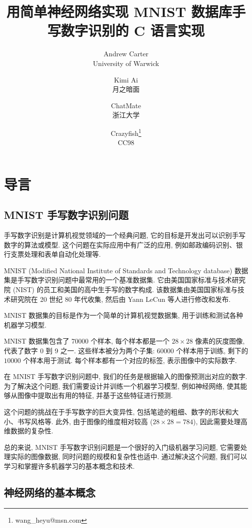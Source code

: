 \documentclass{ctexart}
\title{用简单神经网络实现 MNIST 数据库手写数字识别的 C 语言实现}
\author{Andrew Carter \\ University of Warwick \and Kimi Ai \\ 月之暗面 
\and ChatMate \\ 浙江大学 
\and Crazyfish\footnote{wang\_heyu@msn.com} \\ CC98}
\date{}
\begin{document}
\maketitle

\section{导言}
\label{sec::introduction}

\subsection{MNIST 手写数字识别问题}

手写数字识别是计算机视觉领域的一个经典问题, 它的目标是开发出可以识别手写数字的算法或模型.
这个问题在实际应用中有广泛的应用, 例如邮政编码识别、银行支票处理和表单自动化处理等\cite{lecun1998gradient}.

MNIST (Modified National Institute of Standards and Technology database)
数据集是手写数字识别问题中最常用的一个基准数据集. 它由美国国家标准与技术研究院 (NIST) 的员工和美国的高中生手写的数字构成.
该数据集由美国国家标准与技术研究院在 20 世纪 80 年代收集, 然后由 Yann LeCun 等人进行修改和发布\cite{lecun2010mnist}.

MNIST 数据集的目标是作为一个简单的计算机视觉数据集, 用于训练和测试各种机器学习模型.

MNIST 数据集包含了 70000 个样本, 每个样本都是一个 $28 \times 28$ 像素的灰度图像,
代表了数字 0 到 9 之一. 这些样本被分为两个子集: $60000$ 个样本用于训练,
剩下的 $10000$ 个样本用于测试. 每个样本都有一个对应的标签,
表示图像中的实际数字\cite{simard2003best}.

在 MNIST 手写数字识别问题中, 我们的任务是根据输入的图像预测出对应的数字. 为了解决这个问题,
我们需要设计并训练一个机器学习模型, 例如神经网络, 使其能够从图像中提取出有用的特征,
并基于这些特征进行预测\cite{ciresan2012multi}.

这个问题的挑战在于手写数字的巨大变异性, 包括笔迹的粗细、数字的形状和大小、书写风格等.
此外, 由于图像的维度相对较高 ($28 \times 28 = 784$), 因此需要处理高维数据的复杂性.

总的来说, MNIST 手写数字识别问题是一个很好的入门级机器学习问题, 它需要处理实际的图像数据,
同时问题的规模和复杂性也适中. 通过解决这个问题, 我们可以学习和掌握许多机器学习的基本概念和技术.

\subsection{神经网络的基本概念}
\end{document}
